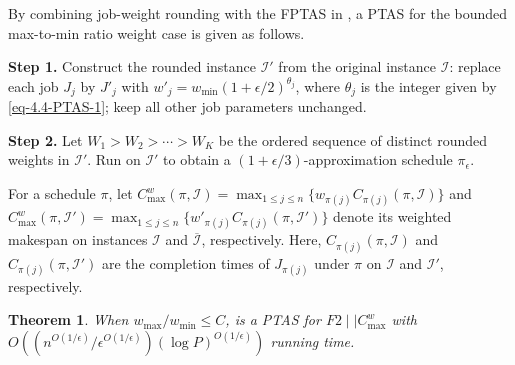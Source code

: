 \documentclass[12pt]{article}
\newtheorem{theorem}{Theorem}[section]
\begin{document}
\begin{sloppypar}
        
        By combining job-weight rounding with the FPTAS in , a PTAS for the bounded max-to-min ratio weight case is given as follows.
        
        \begin{algorithm}[H]
            \small
            \linespread{1.2}\selectfont
            \SetAlgoLined
            \DontPrintSemicolon
            \caption{A PTAS for $F2 \mid \mid C_{\max}^w$ with bounded max-to-min weight ratio}  \label{Alg-PTAS}
            \BlankLine
            \textbf{Step 1.} Construct the rounded instance $\mathcal{I}'$ from the original instance $\mathcal{I}$: replace each job $J_j$ by $J'_j$ with $w'_j=w_{\min}(1+\epsilon/2)^{\theta_j}$, where $\theta_j$ is the integer given by \cref{eq-4.4-PTAS-1}; keep all other job parameters unchanged. \;
            
            \textbf{Step 2.} Let $W_1 >W_2> \cdots >W_K$ be the ordered sequence of distinct rounded weights in $\mathcal{I}'$. Run  on $\mathcal{I}'$ to obtain a $(1+\epsilon/3)$-approximation schedule $\pi_{\epsilon}$. \;
            
        \end{algorithm}
        
        For a schedule $\pi$, let $C_{\max}^w(\pi, \mathcal{I})=\max_{1 \leq j \leq n}\{ w_{\pi(j)} C_{\pi(j)}(\pi,\mathcal{I})\}$ and $C_{\max}^w(\pi,\mathcal{I}')=\max_{1 \leq j \leq n}\{ w'_{\pi(j)} C_{\pi(j)}(\pi, \mathcal{I}')\}$ denote its weighted makespan on instances $\mathcal{I}$ and $\overline{\mathcal{I}}$, respectively. Here, $C_{\pi(j)}(\pi,\mathcal{I})$ and $C_{\pi(j)}(\pi, \mathcal{I}')$ are the completion times of $J_{\pi(j)}$ under $\pi$ on $\mathcal{I}$ and $\mathcal{I}'$, respectively. 
        
        \begin{theorem} \label{Theorem-PTAS}
            When $w_{\max}/w_{\min} \leq C$,  is a PTAS for $F2 \mid \mid C_{\max}^w$ with $O((n^{O(1/\epsilon)}/\epsilon^{O(1/\epsilon)}) (\log P)^{O(1/\epsilon)})$ running time. 
        \end{theorem}
        

\end{sloppypar}
\end{document}
